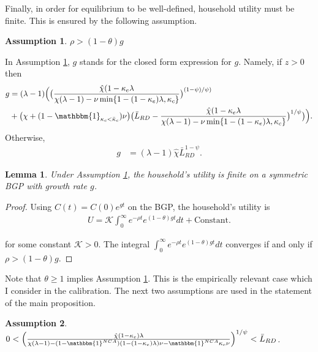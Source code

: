 \documentclass[11pt,english]{article}
\newtheorem{assumption}{Assumption}
\newtheorem{lemma}{Lemma}
\theoremstyle{definition}
\begin{document}
Finally, in order for equilibrium to be well-defined, household utility must be finite. This is ensured by the following assumption.

\begin{assumption}\label{model:assumption:boundedUtility1}
	$\rho > (1-\theta) g$
\end{assumption} 

In Assumption \ref{model:assumption:boundedUtility1}, $g$ stands for the closed form expression for $g$. Namely, if $z > 0$ then 
\begin{align}
	g &= (\lambda - 1) \Big(  \big( \frac{\hat{\chi} (1-\kappa_e \lambda}{\chi(\lambda-1) - \nu \min \{1 - (1-\kappa_e) \lambda, \kappa_c \}} \big)^{(1-\psi)/\psi)} \\
	&+ \big(\chi + (1- \mathbbm{1}_{\kappa_c < \bar{\kappa}_c})\nu \big) \big( \bar{L}_{RD} -  \frac{\hat{\chi} (1-\kappa_e \lambda}{\chi(\lambda-1) - \nu \min \{1 - (1-\kappa_e) \lambda, \kappa_c \}} \big)^{1/\psi} \big) \Big).
\end{align}
Otherwise,
\begin{align}
	g &= (\lambda -1) \hat{\chi} \bar{L}_{RD}^{1-\psi}.
\end{align}

\begin{lemma}
	Under Assumption \ref{model:assumption:boundedUtility1}, the household's utility is finite on a symmetric BGP with growth rate $g$.
\end{lemma}

\begin{proof}
	Using $C(t) = C(0)e^{gt}$ on the BGP, the household's utility is
	\begin{align}
		U = \mathcal{K} \int_0^{\infty} e^{-\rho t} e^{(1-\theta)gt} dt + \text{Constant}.
	\end{align}
	
	for some constant $\mathcal{K} > 0$. The integral $\int_0^{\infty} e^{-\rho t} e^{(1-\theta)gt} dt$ converges if and only if $\rho > (1-\theta)g$. 
\end{proof}

Note that $\theta \ge 1$ implies Assumption \ref{model:assumption:boundedUtility1}. This is the empirically relevant case which I consider in the calibration. The next two assumptions are used in the statement of the main proposition.

\begin{assumption}
	$0 < \Big( \frac{\hat{\chi} (1-\kappa_{e}) \lambda}{\chi(\lambda-1) - (1-\mathbbm{1}^{NCA}) (1- (1-\kappa_e)\lambda)\nu - \mathbbm{1}^{NCA} \kappa_{c} \nu} \Big)^{1/\psi} < \bar{L}_{RD}$. \label{ineq:zhat_market_clearing}
\end{assumption}
\end{document}
